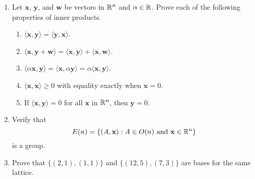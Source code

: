 {\begin{enumerate}
\begin{figure}[htb]
\begin{center}
\end{center}
\caption{}
\label{Determine}
\end{figure}
 
 
\item
Let ${\mathbf x}$, ${\mathbf y}$, and ${\mathbf w}$ be vectors in ${\Bbb
R}^n$ and $\alpha \in {\Bbb R}$.  Prove each of the following
properties of inner products.
\begin{enumerate}
 
 \item
$\langle {\mathbf x}, {\mathbf y} \rangle = \langle {\mathbf y}, {\mathbf x}
\rangle$. 
 
 \item
$\langle {\mathbf x}, {\mathbf y} + {\mathbf w} \rangle = \langle
{\mathbf x}, {\mathbf y} \rangle + \langle {\mathbf x}, {\mathbf w}
\rangle$.
 
 \item
$\langle \alpha {\mathbf x}, {\mathbf y} \rangle = \langle
{\mathbf x}, \alpha {\mathbf y} \rangle = \alpha \langle  {\mathbf
x}, {\mathbf y} \rangle$.
 
 \item
$\langle {\mathbf x}, {\mathbf x} \rangle \geq 0$ with equality exactly
when ${\mathbf x} = 0$. 
 
 \item
If $\langle {\mathbf x}, {\mathbf y} \rangle = 0$  for all ${\mathbf x}$ in
${\Bbb R}^n$, then ${\mathbf y} = 0$. 
 
\end{enumerate}
 
 
\item \label{matrix:En_group_exercise}
Verify that
\[
E(n)
=
\{(A, {\mathbf x}) : A \in O(n) \mbox{ and } {\mathbf x} \in
{\Bbb R}^n \}
\]
is a group.
 
 
\item
Prove that $\{ (2,1), (1,1) \}$  and $\{ ( 12, 5), ( 7, 3) \}$ are bases
for the same lattice. 
 

\end{enumerate}}

